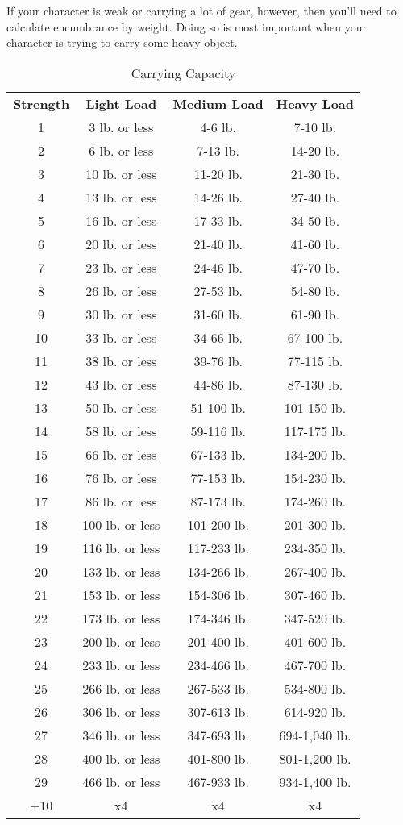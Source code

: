 If your character is weak or carrying a lot of gear, however, then you'll need to calculate encumbrance by weight. Doing so is most important when your character is trying to carry some heavy object.
								

\begin{table}[htb]
\sffamily
{}
\caption{Carrying Capacity}
\centering
\begin{tabular}{c c c c}
\textbf{Strength} & \textbf{Light Load} & \textbf{Medium Load} & \textbf{Heavy Load}\\
1 & 3 lb. or less & 4-6 lb. & 7-10 lb.\\
2 & 6 lb. or less & 7-13 lb. & 14-20 lb.\\
3 & 10 lb. or less & 11-20 lb. & 21-30 lb.\\
4 & 13 lb. or less & 14-26 lb. & 27-40 lb.\\
5 & 16 lb. or less & 17-33 lb. & 34-50 lb.\\
6 & 20 lb. or less & 21-40 lb. & 41-60 lb.\\
7 & 23 lb. or less & 24-46 lb. & 47-70 lb.\\
8 & 26 lb. or less & 27-53 lb. & 54-80 lb.\\
9 & 30 lb. or less & 31-60 lb. & 61-90 lb.\\
10 & 33 lb. or less & 34-66 lb. & 67-100 lb.\\
11 & 38 lb. or less & 39-76 lb. & 77-115 lb.\\
12 & 43 lb. or less & 44-86 lb. & 87-130 lb.\\
13 & 50 lb. or less & 51-100 lb. & 101-150 lb.\\
14 & 58 lb. or less & 59-116 lb. & 117-175 lb.\\
15 & 66 lb. or less & 67-133 lb. & 134-200 lb.\\
16 & 76 lb. or less & 77-153 lb. & 154-230 lb.\\
17 & 86 lb. or less & 87-173 lb. & 174-260 lb.\\
18 & 100 lb. or less & 101-200 lb. & 201-300 lb.\\
19 & 116 lb. or less & 117-233 lb. & 234-350 lb.\\
20 & 133 lb. or less & 134-266 lb. & 267-400 lb.\\
21 & 153 lb. or less & 154-306 lb. & 307-460 lb.\\
22 & 173 lb. or less & 174-346 lb. & 347-520 lb.\\
23 & 200 lb. or less & 201-400 lb. & 401-600 lb.\\
24 & 233 lb. or less & 234-466 lb. & 467-700 lb.\\
25 & 266 lb. or less & 267-533 lb. & 534-800 lb.\\
26 & 306 lb. or less & 307-613 lb. & 614-920 lb.\\
27 & 346 lb. or less & 347-693 lb. & 694-1,040 lb.\\
28 & 400 lb. or less & 401-800 lb. & 801-1,200 lb.\\
29 & 466 lb. or less & 467-933 lb. & 934-1,400 lb.\\
+10 & x4 & x4 & x4\\
\end{tabular}
\end{table}


